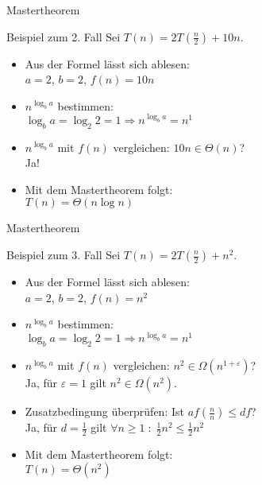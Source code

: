 \begin{frame}{Mastertheorem}
    \begin{exampleblock}{Beispiel zum 2. Fall}
    	Sei $T(n) = 2 T \left(\frac{n}{2} \right) + 10n$.
    	\begin{itemize}
    		\item Aus der Formel lässt sich ablesen:\\
    			$a=2$, $b=2$, $f(n)=10n$
    		\item $n^{\log_b a}$ bestimmen:\\
    			$\log_b a = \log_2 2 = 1 \Rightarrow n^{\log_b a} = n^1$
    		\item $n^{\log_b a}$ mit $f(n)$ vergleichen: $10n \in \Theta(n)$?\\
    			Ja!
    		\item Mit dem Mastertheorem folgt:\\
    			$T(n) = \Theta(n \log n)$
    	\end{itemize}
    \end{exampleblock}
\end{frame}



\begin{frame}{Mastertheorem}
    \begin{exampleblock}{Beispiel zum 3. Fall}
    	Sei $T(n) = 2 T \left(\frac{n}{2} \right) + n^2$.
    	\begin{itemize}
    		\item Aus der Formel lässt sich ablesen:\\
    			$a=2$, $b=2$, $f(n)=n^2$
    		\item $n^{\log_b a}$ bestimmen:\\
    			$\log_b a = \log_2 2 = 1 \Rightarrow n^{\log_b a} = n^1$
    		\item $n^{\log_b a}$ mit $f(n)$ vergleichen: $n^2 \in \Omega(n^{1+\varepsilon})$?\\
    			Ja, für $\varepsilon = 1$ gilt $n^2 \in \Omega(n^2)$.
    		\item Zusatzbedingung überprüfen: Ist $af\left(\frac{n}{n}\right)\leq d f$?\\
    			Ja, für $d = \frac{1}{2}$ gilt $\forall n \geq 1 \; : \; \frac{1}{2}n^2 \leq \frac{1}{2}n^2$
    		\item Mit dem Mastertheorem folgt:\\
    			$T(n) = \Theta(n^2)$
    	\end{itemize}
    \end{exampleblock}
\end{frame}